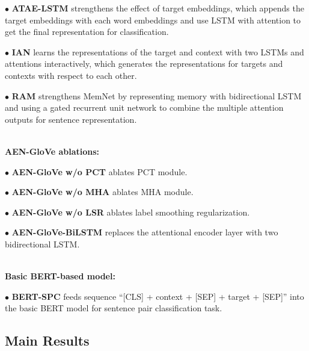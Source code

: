 \documentclass[11pt,a4paper]{article}
\begin{document}
$\bullet$ \textbf{ATAE-LSTM} \cite{wang2016attention} strengthens the effect of target embeddings, which appends the target embeddings with each word embeddings and use LSTM with attention to get the final representation for classification.

$\bullet$ \textbf{IAN} \cite{ma2017interactive} learns the representations of the target and context with two LSTMs and attentions interactively, which generates the representations for targets and contexts with respect to each other.

$\bullet$ \textbf{RAM} \cite{chen2017recurrent} strengthens MemNet by representing memory with bidirectional LSTM and using a gated recurrent unit network to combine the multiple attention outputs for sentence representation.

~\\
\textbf{AEN-GloVe ablations:}

$\bullet$ \textbf{AEN-GloVe w/o PCT} ablates PCT module.

$\bullet$ \textbf{AEN-GloVe w/o MHA} ablates MHA module.

$\bullet$ \textbf{AEN-GloVe w/o LSR} ablates label smoothing regularization.

$\bullet$ \textbf{AEN-GloVe-BiLSTM} replaces the attentional encoder layer with two bidirectional LSTM.


~\\
\textbf{Basic BERT-based model:}

$\bullet$ \textbf{BERT-SPC} feeds sequence ``[CLS] + context + [SEP] + target + [SEP]''
into the basic BERT model for sentence pair classification task.


\subsection{Main Results}
\end{document}
